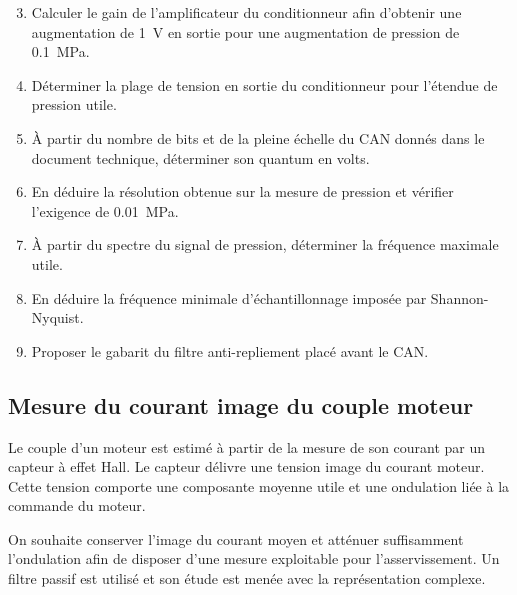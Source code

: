 \begin{enumerate}
  \setcounter{enumi}{2}
  \item Calculer le gain de l'amplificateur du conditionneur afin d'obtenir une augmentation de \SI{1}{\volt} en sortie pour une augmentation de pression de \SI{0.1}{\mega\pascal}.
  \item Déterminer la plage de tension en sortie du conditionneur pour l'étendue de pression utile.
  \item À partir du nombre de bits et de la pleine échelle du CAN donnés dans le document technique, déterminer son quantum en volts.
  \item En déduire la résolution obtenue sur la mesure de pression et vérifier l'exigence de \SI{0.01}{\mega\pascal}.
  \item À partir du spectre du signal de pression, déterminer la fréquence maximale utile.
  \item En déduire la fréquence minimale d'échantillonnage imposée par Shannon-Nyquist.
  \item Proposer le gabarit du filtre anti-repliement placé avant le CAN.
\end{enumerate}

\subsection{Mesure du courant image du couple moteur}

Le couple d'un moteur est estimé à partir de la mesure de son courant par un capteur à effet Hall. Le capteur délivre une tension image du courant moteur. Cette tension comporte une composante moyenne utile et une ondulation liée à la commande du moteur.

On souhaite conserver l'image du courant moyen et atténuer suffisamment l'ondulation afin de disposer d'une mesure exploitable pour l'asservissement. Un filtre passif est utilisé et son étude est menée avec la représentation complexe.

